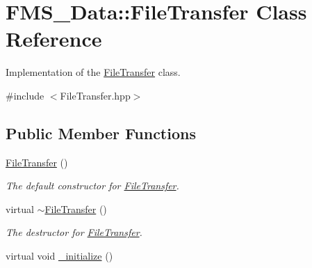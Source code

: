 \hypertarget{classFMS__Data_1_1FileTransfer}{
\section{FMS\_\-Data::FileTransfer Class Reference}
\label{classFMS__Data_1_1FileTransfer}
}


Implementation of the \hyperlink{classFMS__Data_1_1FileTransfer}{FileTransfer} class.  




{\ttfamily \#include $<$FileTransfer.hpp$>$}

\subsection*{Public Member Functions}
\begin{DoxyCompactItemize}
\item 
\hypertarget{classFMS__Data_1_1FileTransfer_a0c666f8054258ef6307ad3f9aaafb091}{
\hyperlink{classFMS__Data_1_1FileTransfer_a0c666f8054258ef6307ad3f9aaafb091}{FileTransfer} ()}
\label{classFMS__Data_1_1FileTransfer_a0c666f8054258ef6307ad3f9aaafb091}

\begin{DoxyCompactList}\small\item\em The default constructor for \hyperlink{classFMS__Data_1_1FileTransfer}{FileTransfer}. \item\end{DoxyCompactList}\item 
\hypertarget{classFMS__Data_1_1FileTransfer_a8642f7154ddbbf4732103cfeca31bea5}{
virtual \hyperlink{classFMS__Data_1_1FileTransfer_a8642f7154ddbbf4732103cfeca31bea5}{$\sim$FileTransfer} ()}
\label{classFMS__Data_1_1FileTransfer_a8642f7154ddbbf4732103cfeca31bea5}

\begin{DoxyCompactList}\small\item\em The destructor for \hyperlink{classFMS__Data_1_1FileTransfer}{FileTransfer}. \item\end{DoxyCompactList}\item 
\hypertarget{classFMS__Data_1_1FileTransfer_a6730517b803d25cb5a80b1b88fe6d694}{
virtual void \hyperlink{classFMS__Data_1_1FileTransfer_a6730517b803d25cb5a80b1b88fe6d694}{\_\-initialize} ()}
\label{classFMS__Data_1_1FileTransfer_a6730517b803d25cb5a80b1b88fe6d694}


\end{DoxyCompactItemize}
